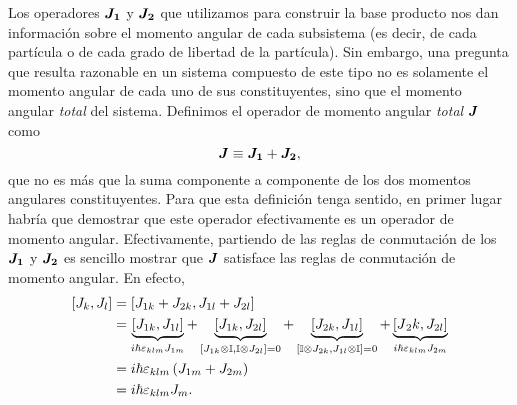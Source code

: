 \documentclass[10pt, a4paper]{article}
\numberwithin{equation}{subsection}
\begin{document}
Los operadores $\vb*{J_1}$ y $\vb*{J_2}$ que utilizamos para construir la
base producto nos dan información sobre el momento angular de cada subsistema
(es decir, de cada partícula o de cada grado de libertad de la partícula). Sin
embargo, una pregunta que resulta razonable en un sistema compuesto de este
tipo no es solamente el momento angular de cada uno de sus constituyentes, sino
que el momento angular \emph{total} del sistema. Definimos el operador de
momento angular \emph{total} $\vb*{J}$ como
\begin{equation}
  \vb*{J} \equiv \vb*{J_1} + \vb*{J_2},
\end{equation}
que no es más que la suma componente a componente de los dos momentos angulares
constituyentes. Para que esta definición tenga sentido, en primer lugar habría
que demostrar que este operador efectivamente es un operador de momento
angular. Efectivamente, partiendo de las reglas de conmutación de los
$\vb*{J_1}$ y $\vb*{J_2}$ es sencillo mostrar que $\vb*{J}$ satisface las
reglas de conmutación de momento angular. En efecto,
\begin{align}
  \comm{J_k}{J_l} &= \comm{J_{1k} + J_{2k}}{J_{1l} + J_{2l}} \nonumber \\
  &= \underbrace{\comm{J_{1k}}{J_{1l}}}_{i\hbar\lchivita_{klm}J_{1m}} +
    \underbrace{\comm{J_{1k}}{J_{2l}}}_{\comm{J_{1k}\tensor\Id}{\Id\tensor
    J_{2l}} = 0} + \underbrace{\comm{J_{2k}}{J_{1l}}}_{\comm{\Id\tensor
    J_{2k}}{J_{1l}\tensor\Id} = 0} +
    \underbrace{\comm{J{_2k}}{J_{2l}}}_{i\hbar\lchivita_{klm}J_{2m}} \nonumber
    \\
  &= i\hbar\lchivita_{klm}\left(J_{1m} + J_{2m}\right) \nonumber \\
  &= i\hbar\lchivita_{klm}J_m.
\end{align}
\end{document}
